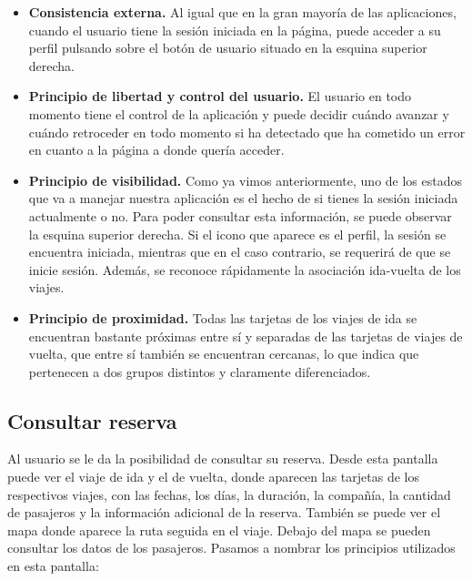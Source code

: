 \begin{itemize}
    \item \textbf{Consistencia externa.} Al igual que en la gran mayoría de las aplicaciones, cuando el usuario
        tiene la sesión iniciada en la página, puede acceder a su perfil pulsando sobre el botón de usuario situado
        en la esquina superior derecha.
    \item \textbf{Principio de libertad y control del usuario.} El usuario en todo momento tiene el control de la
        aplicación y puede decidir cuándo avanzar y cuándo retroceder en todo momento si ha detectado que ha
        cometido un error en cuanto a la página a donde quería acceder.
    \item \textbf{Principio de visibilidad.} Como ya vimos anteriormente, uno de los estados que va a manejar
        nuestra aplicación es el hecho de si tienes la sesión iniciada actualmente o no. Para poder consultar
        esta información, se puede observar la esquina superior derecha. Si el icono que aparece es el perfil,
        la sesión se encuentra iniciada, mientras que en el caso contrario, se requerirá de que se inicie sesión. Además,
        se reconoce rápidamente la asociación ida-vuelta de los viajes.
    \item \textbf{Principio de proximidad.} Todas las tarjetas de los viajes de ida se encuentran bastante próximas entre sí
        y separadas de las tarjetas de viajes de vuelta, que entre sí también se encuentran cercanas, lo que indica
        que pertenecen a dos grupos distintos y claramente diferenciados.
\end{itemize}

\subsection*{Consultar reserva}

Al usuario se le da la posibilidad de consultar su reserva. Desde esta pantalla puede ver el viaje de ida y el
de vuelta, donde aparecen las tarjetas de los respectivos viajes, con las fechas, los días, la duración, la compañía,
la cantidad de pasajeros y la información adicional de la reserva. También se puede ver el mapa donde aparece la
ruta seguida en el viaje. Debajo del mapa se pueden consultar los datos de los pasajeros. Pasamos a nombrar los
principios utilizados en esta pantalla:

